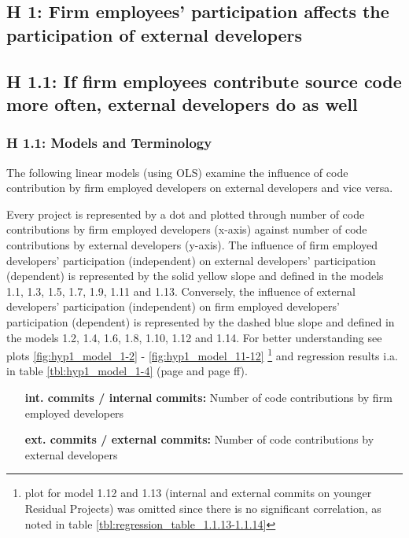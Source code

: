 \begin{itemize}
\end{itemize}

\subsection{H 1: Firm employees' participation affects the participation of external developers}
\subsection{H 1.1: If firm employees contribute source code more often, external developers do as well}

\subsubsection{H 1.1: Models and Terminology}

The following linear models (using OLS) examine the influence of code contribution by firm employed developers on external developers and vice versa.

Every project is represented by a dot and plotted through number of code contributions by firm employed developers (x-axis) against number of code contributions by external developers (y-axis). The influence of firm employed developers' participation (independent) on external developers' participation (dependent) is represented by the solid yellow slope and defined in the models 1.1, 1.3, 1.5, 1.7, 1.9, 1.11 and 1.13. Conversely, the influence of external developers' participation (independent) on firm employed developers' participation (dependent) is represented by the dashed blue slope and defined in the models 1.2, 1.4, 1.6, 1.8, 1.10, 1.12 and 1.14. For better understanding see plots \ref{fig:hyp1_model_1-2} - \ref{fig:hyp1_model_11-12} \footnote{plot for model 1.12 and 1.13 (internal and external commits on younger Residual Projects) was omitted since there is no significant correlation, as noted in table \ref{tbl:regression_table_1.1.13-1.1.14}} and regression results i.a. in table \ref{tbl:hyp1_model_1-4} (page \pageref{tbl:hyp1_model_1-4} and page \pageref{sec:regression_tables_h1.1}ff).

\begin{itemize}
	\item [\textbf{int. commits / internal commits:}] Number of code contributions by firm employed developers
	\item [\textbf{ext. commits / external commits:}] Number of code contributions by external developers
\end{itemize}


